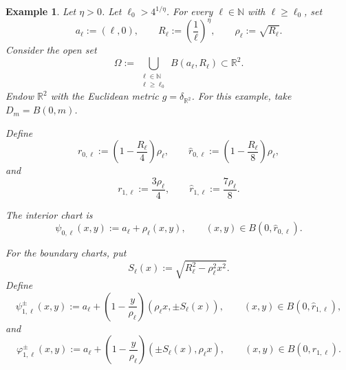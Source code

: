\documentclass[reqno, 11pt, a4paper]{amsart}
\newtheorem{example}[theorem]{Example}
\numberwithin{equation}{section}
\newcommand{\R}{\mathbb{R}}
\newcommand{\N}{\mathbb{N}}
\begin{document}


\begin{example}\label{ex:shrinking-components-eta}
Let $\eta>0$. Let $\ell_0 > 4^{1/\eta}$. For every
$\ell\in\N$ with $\ell\geq\ell_0$, set
\[
a_\ell:=(\ell,0),
\qquad
R_\ell:=\left( \frac1\ell \right)^\eta,
\qquad
\rho_\ell:=\sqrt{R_\ell}.
\]
Consider the open set
\[
{ 
\Omega
:=
\bigcup_{\substack{\ell\in\N\\ \ell\geq\ell_0}}B(a_\ell,R_\ell)
\subset\R^2.
}
\]
Endow \(\mathbb R^2\) with the Euclidean metric \(g=\delta_{\R^2}\). { For this example, take \(D_m=B(0,m)\).} %

Define
\[
r_{0,\ell}:=\left(1-\frac{R_\ell}{4}\right)\rho_\ell,
\qquad
\hat r_{0,\ell}:=\left(1-\frac{R_\ell}{8}\right)\rho_\ell,
\]
and
\[
r_{1,\ell}:=\frac{3\rho_\ell}{4},
\qquad
\hat r_{1,\ell}:=\frac{7\rho_\ell}{8}.
\]

The interior chart is
\[
\psi_{0,\ell}(x,y):=a_\ell+\rho_\ell(x,y),
\qquad
(x,y)\in B(0,\hat r_{0,\ell}).
\]

For the boundary charts, put
\[
S_\ell(x):=\sqrt{R_\ell^2-\rho_\ell^2x^2}.
\]
Define
\[
\psi_{1,\ell}^{\pm }(x,y)
:=
a_\ell+
\left(1-\frac{y}{\rho_\ell}\right)
\left(
\rho_\ell x,
\pm S_\ell(x)
\right),
\qquad
(x,y)\in B(0,\hat r_{1,\ell}),
\]
and
\[
\varphi_{1,\ell}^{\pm}(x,y)
:=
a_\ell+
\left(1-\frac{y}{\rho_\ell}\right)
\left(
\pm S_\ell(x),
\rho_\ell x
\right),
\qquad
(x,y)\in B(0,\hat r_{1,\ell}).
\]




\end{example}
\end{document}
